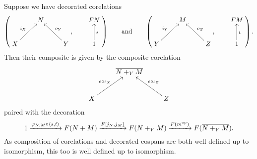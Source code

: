 Suppose we have decorated corelations
\[
  \left(
  \begin{aligned}
    \xymatrix{
      & N \\  
      X \ar[ur]^{i_X} && Y \ar[ul]_{o_Y}
    }
  \end{aligned}
  ,
  \qquad
  \begin{aligned}
    \xymatrix{
      FN \\
      1 \ar[u]_{s}
    }
  \end{aligned}
  \right)
  \qquad
  \mbox{and}
  \qquad
  \left(
  \begin{aligned}
    \xymatrix{
      & M \\  
      Y \ar[ur]^{i_Y} && Z \ar[ul]_{o_Z}
    }
  \end{aligned}
  ,
  \qquad
  \begin{aligned}
    \xymatrix{
      FM \\
      1 \ar[u]_{t}
    }
  \end{aligned}
  \right).
\]
Then their composite is given by the composite corelation
\[
  \xymatrix{
    & \overline{N+_YM} \\  
    X \ar[ur]^{e\circ \iota_X} && Z \ar[ul]_{e \circ \iota_Z}
  }
\]
paired with the decoration
\[
  1 \xrightarrow{\varphi_{N,M}\circ\langle s,t\rangle} F(N+M)
  \xrightarrow{F[j_N,j_M]} F(N+_YM) \xrightarrow{F(m^{\mathrm{op}})} F(\overline{N+_YM}).
\]
As composition of corelations and decorated cospans are both well defined up to
isomorphism, this too is well defined up to isomorphism. 

